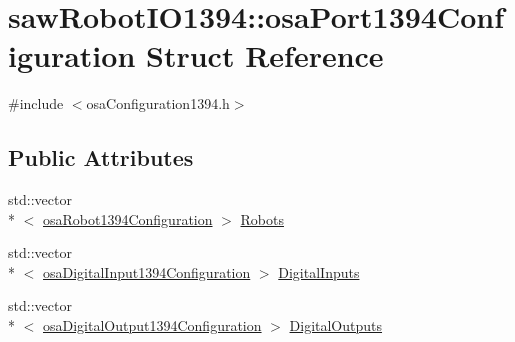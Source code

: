 \hypertarget{structsaw_robot_i_o1394_1_1osa_port1394_configuration}{\section{saw\-Robot\-I\-O1394\-:\-:osa\-Port1394\-Configuration Struct Reference}
\label{structsaw_robot_i_o1394_1_1osa_port1394_configuration}
}


{\ttfamily \#include $<$osa\-Configuration1394.\-h$>$}

\subsection*{Public Attributes}
\begin{DoxyCompactItemize}
\item 
std\-::vector\\*
$<$ \hyperlink{structsaw_robot_i_o1394_1_1osa_robot1394_configuration}{osa\-Robot1394\-Configuration} $>$ \hyperlink{structsaw_robot_i_o1394_1_1osa_port1394_configuration_ad6f5d420583316ff00715bf069fa8f99}{Robots}
\item 
std\-::vector\\*
$<$ \hyperlink{structsaw_robot_i_o1394_1_1osa_digital_input1394_configuration}{osa\-Digital\-Input1394\-Configuration} $>$ \hyperlink{structsaw_robot_i_o1394_1_1osa_port1394_configuration_aa3c3d154b6b2543457126359f09d1411}{Digital\-Inputs}
\item 
std\-::vector\\*
$<$ \hyperlink{structsaw_robot_i_o1394_1_1osa_digital_output1394_configuration}{osa\-Digital\-Output1394\-Configuration} $>$ \hyperlink{structsaw_robot_i_o1394_1_1osa_port1394_configuration_ab2ea227f5d5b7124c154903edbe8f2d7}{Digital\-Outputs}
\end{DoxyCompactItemize}


